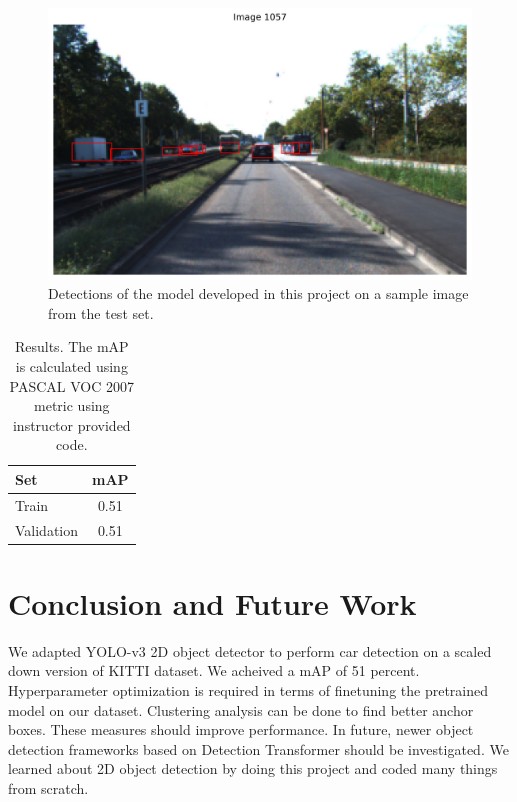\documentclass[10pt,twocolumn,letterpaper]{article}
\begin{document}
\begin{figure}[t]
	\begin{center}
		\includegraphics[width=1.0\linewidth]{figure1057.png}
	\end{center}
	\caption{Detections of the model developed in this project on a sample image from the test set.}
	\label{fig:pred_example_plot2}
\end{figure}


\begin{table}
	\begin{center}
		\begin{tabular}{|l|c|}
			\hline
			Set & mAP \\
			\hline\hline
			Train & 0.51 \\
			Validation & 0.51\\
			\hline
		\end{tabular}
	\end{center}
	\caption{Results. The mAP is calculated using PASCAL VOC 2007 metric using instructor provided code.}
	\label{tab:results}
\end{table}

\section{Conclusion and Future Work}
We adapted YOLO-v3 2D object detector to perform car detection on a scaled down version of KITTI dataset. We acheived a mAP of 51 percent. Hyperparameter optimization is required in terms of finetuning the pretrained model on our dataset. Clustering analysis can be done to find better anchor boxes. These measures should improve performance. In future, newer object detection frameworks based on Detection Transformer should be investigated. We learned about 2D object detection by doing this project and coded many things from scratch.

{\small


}
\end{document}
